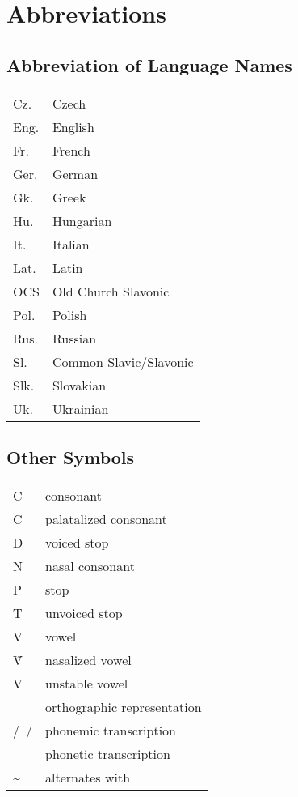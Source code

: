 
\chapter*{Abbreviations}
\printglossary[style=myglosses,type=\leipzigtype, title={Glossing abbreviations}]
\clearpage

\section*{Abbreviation of Language Names}
\begin{longtabu} {YY[2.5]}
	Cz.		& Czech\\
	Eng.	& English\\
	Fr.		& French\\
	Ger.	& German\\
	Gk.		& Greek\\
	Hu.		& Hungarian\\
	It.		& Italian\\
	Lat.	& Latin\\
	OCS		& Old Church Slavonic\\
	Pol.	& Polish\\
	Rus.	& Russian\\
	Sl.		& Common Slavic/Slavonic\\
	Slk.	& Slovakian\\
	Uk.		& Ukrainian\\
\end{longtabu}


\section*{Other Symbols}
\begin{longtabu} {YY[2.5]}
	C 		& consonant\\
	C	& palatalized consonant\\
	D 		& voiced stop\\
	N 		& nasal consonant\\
	P 		& stop\\
	T 		& unvoiced stop\\
	V		& vowel\\
	Ṽ	 	& nasalized vowel\\
	V& unstable vowel\\
	\orth{~}& orthographic representation\\
	/~/		& phonemic transcription\\
	\nt{ }	& phonetic transcription\\
	\sim	& alternates with\\
\end{longtabu}
